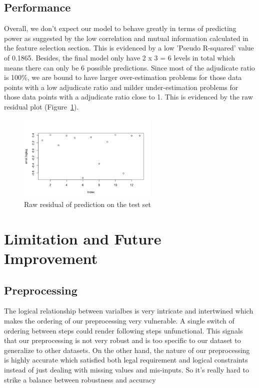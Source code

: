 \documentclass[12pt, b4paper]{article}
\begin{document}
  \subsection{Performance}
  Overall, we don't expect our model to behave greatly in terms of predicting power as suggested by the low correlation and mutual information calculated in the feature selection section. This is evidenced by a low 'Pseudo R-squared' value of 0.1865. Besides, the final model only have 2 x 3 = 6 levels in total which means there can only be 6 possible predictions. Since most of the adjudicate ratio is 100\%, we are bound to have larger over-estimation problems for those data points with a low adjudicate ratio and milder under-estimation problems for those data points with a adjudicate ratio close to 1. This is evidenced by the raw residual plot (Figure~\ref{fig:rawResidualOnTest}). 
  \begin{figure}
    \begin{center}
      \includegraphics[width=0.6\textwidth]{plots/rawResidualOnTest.png}
    \end{center}
    \caption{Raw residual of prediction on the test set}
    \label{fig:rawResidualOnTest}
  \end{figure}
  

  \section{Limitation and Future Improvement}
  \subsection{Preprocessing}
  The logical relationship between varialbes is very intricate and intertwined which makes the ordering of our preprocessing very vulnerable. A single switch of ordering between steps could render following steps unfunctional.  
  This signals that our preprocessing is not very robust and is too specific to our dataset to generalize to other datasets.  
  On the other hand, the nature of our preprocessing is highly accurate which satisfied both legal requirement and logical constraints instead of just dealing with missing values and mis-inputs. 
  So it's really hard to strike a balance between robustness and accuracy
\end{document}
